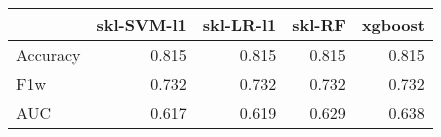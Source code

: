 \begin{tabular}{lrrrr}
\toprule
{} &  skl-SVM-l1 &  skl-LR-l1 &  skl-RF &  xgboost \\
\midrule
Accuracy &       0.815 &      0.815 &   0.815 &    0.815 \\
F1w      &       0.732 &      0.732 &   0.732 &    0.732 \\
AUC      &       0.617 &      0.619 &   0.629 &    0.638 \\
\bottomrule
\end{tabular}

